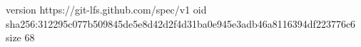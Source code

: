 version https://git-lfs.github.com/spec/v1
oid sha256:312295c077b509845de5e8d42d2f4d31ba0e945e3adb46a8116394df223776c6
size 68
